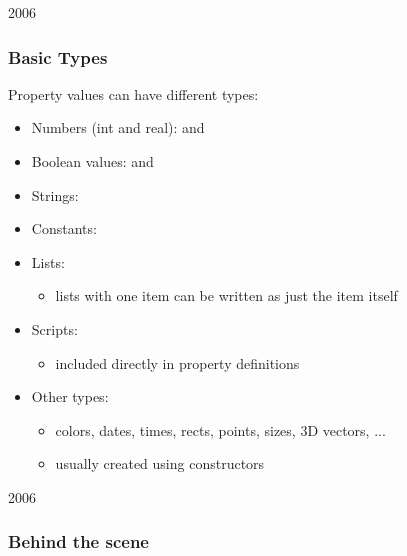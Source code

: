 \begin{slide}{2006}\frametitle{Basic Types}
Property values can have different types:
\begin{itemize}
\item Numbers (int and real):  and 
\item Boolean values:  and 
\item Strings: 
\item Constants: 
\vspace*{0.25em}
\item Lists: 
  \begin{itemize}
  \item lists with one item can be written as just the item itself
  \end{itemize}
  \vspace*{0.25em}
\item Scripts:
  \begin{itemize}
  \item included directly in property definitions
  \end{itemize}
  \vspace*{0.25em}
\item Other types:
  \begin{itemize}
  \item colors, dates, times, rects, points, sizes, 3D vectors, ...
  \item usually created using constructors
  \end{itemize}
\end{itemize}


\end{slide}


\begin{slide}{2006}\frametitle{Behind the scene}
\vspace{10mm}

\end{slide}

